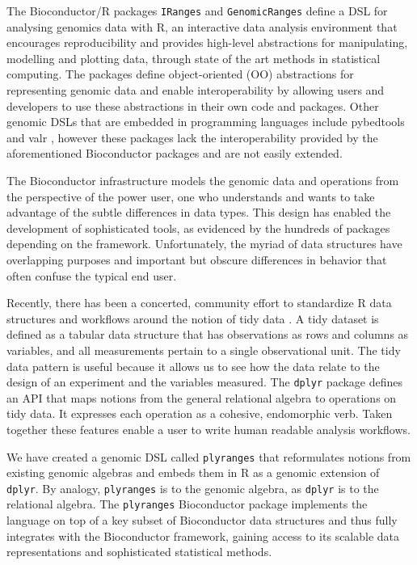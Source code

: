 \documentclass[]{article}
\begin{document}
The Bioconductor/R packages \texttt{IRanges} and \texttt{GenomicRanges}
\autocites{r-core}{Lawrence2013-wg}{Huber2015-ei} define a DSL for
analysing genomics data with R, an interactive data analysis environment
that encourages reproducibility and provides high-level abstractions for
manipulating, modelling and plotting data, through state of the art
methods in statistical computing. The packages define object-oriented
(OO) abstractions for representing genomic data and enable
interoperability by allowing users and developers to use these
abstractions in their own code and packages. Other genomic DSLs that are
embedded in programming languages include pybedtools and valr
\autocites{Dale2011-js}{Kent2017}, however these packages lack the
interoperability provided by the aforementioned Bioconductor packages
and are not easily extended.

The Bioconductor infrastructure models the genomic data and operations
from the perspective of the power user, one who understands and wants to
take advantage of the subtle differences in data types. This design has
enabled the development of sophisticated tools, as evidenced by the
hundreds of packages depending on the framework. Unfortunately, the
myriad of data structures have overlapping purposes and important but
obscure differences in behavior that often confuse the typical end user.

Recently, there has been a concerted, community effort to standardize R
data structures and workflows around the notion of tidy data
\cite{Wickham2014-jc}. A tidy dataset is defined as a tabular data
structure that has observations as rows and columns as variables, and
all measurements pertain to a single observational unit. The tidy data
pattern is useful because it allows us to see how the data relate to the
design of an experiment and the variables measured. The \texttt{dplyr}
package \cite{Wickham2017-dplyr} defines an API that maps notions from
the general relational algebra to operations on tidy data. It expresses
each operation as a cohesive, endomorphic verb. Taken together these
features enable a user to write human readable analysis workflows.

We have created a genomic DSL called \texttt{plyranges} that
reformulates notions from existing genomic algebras and embeds them in R
as a genomic extension of \texttt{dplyr}. By analogy, \texttt{plyranges}
is to the genomic algebra, as \texttt{dplyr} is to the relational
algebra. The \texttt{plyranges} Bioconductor package implements the
language on top of a key subset of Bioconductor data structures and thus
fully integrates with the Bioconductor framework, gaining access to its
scalable data representations and sophisticated statistical methods.
\end{document}

